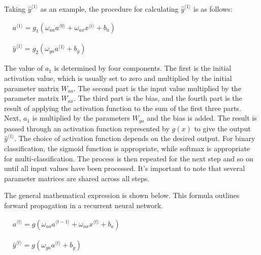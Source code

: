 \documentclass{article}
\begin{document}
Taking ${\hat{y}}^{\langle 1\rangle}$ as an example, the procedure for calculating ${\hat{y}}^{\langle 1\rangle}$ is as follows:

\hspace*{\fill}

$\begin{aligned} & a^{\langle 1\rangle}=g_1\left(\omega_{a a} a^{\langle 0\rangle}+\omega_{a x} x^{\langle i\rangle}+b_a\right)\end{aligned}$\\
\hspace*{\fill}

$\begin{aligned} & {\hat{y}}^{\langle 1\rangle}=g_2\left(\omega_{y a} a^{\langle 1\rangle}+b_y\right) \end{aligned} $\\
\hspace*{\fill}


The value of $a_1$ is determined by four components. The first is the initial activation value, which is usually set to zero and multiplied by the initial parameter matrix $W_{aa}$. The second part is the input value multiplied by the parameter matrix $W_{ax}$. The third part is the bias, and the fourth part is the result of applying the activation function to the sum of the first three parts. Next, $a_1$ is multiplied by the parameters $W_{ya}$ and the bias is added. The result is passed through an activation function represented by $g(x)$ to give the output ${\hat{y}}^{\langle 1\rangle}$. The choice of activation function depends on the desired output. For binary classification, the sigmoid function is appropriate, while softmax is appropriate for multi-classification. The process is then repeated for the next step and so on until all input values have been processed. It's important to note that several parameter matrices are shared across all steps.

The general mathematical expression is shown below. This formula outlines forward propagation in a recurrent neural network.

\hspace*{\fill}

$\begin{aligned} & a^{\langle t\rangle}=g\left(\omega_{a a} a^{\langle t-1\rangle}+\omega_{a x} x^{\langle t\rangle}+b_a\right) \end{aligned}$\\
\hspace*{\fill}

$\begin{aligned} & \hat{y}^{\langle t\rangle}=g\left(\omega_{ya} a^{\langle t\rangle}+b_y\right)\end{aligned}$\\
\hspace*{\fill}
\end{document}
